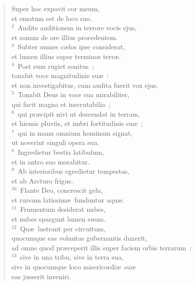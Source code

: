 \begin{flushleft}\begin{verse}\vspace{-19pt}\hspace{6pt}Super hoc expavit cor meum,\\\hspace{6pt} et emotum est de loco suo.\\
${}^{2}$~Audite auditionem in terrore vocis ejus,\\ et sonum de ore illius procedentem.\\
${}^{3}$~Subter omnes c\ae los ipse considerat,\\ et lumen illius super terminos terr\ae .\\
${}^{4}$~Post eum rugiet sonitus~;\\ tonabit voce magnitudinis su\ae~:\\ et non investigabitur, cum audita fuerit vox ejus.\\
${}^{5}$~Tonabit Deus in voce sua mirabiliter,\\ qui facit magna et inscrutabilia~;\\
${}^{6}$~qui pr\ae cipit nivi ut descendat in terram,\\ et hiemis pluviis, et imbri fortitudinis su\ae~;\\
${}^{7}$~qui in manu omnium hominum signat,\\ ut noverint singuli opera sua.\\
${}^{8}$~Ingredietur bestia latibulum,\\ et in antro suo morabitur.\\
${}^{9}$~Ab interioribus egredietur tempestas,\\ et ab Arcturo frigus.\\
${}^{10}$~Flante Deo, concrescit gelu,\\ et rursum latissim\ae\ funduntur aqu\ae .\\
${}^{11}$~Frumentum desiderat nubes,\\ et nubes spargunt lumen suum.\\
${}^{12}$~Qu\ae\ lustrant per circuitum,\\ quocumque eas voluntas gubernantis duxerit,\\ ad omne quod pr\ae ceperit illis super faciem orbis terrarum~:\\
${}^{13}$~sive in una tribu, sive in terra sua,\\ sive in quocumque loco misericordi\ae\ su\ae \\ eas jusserit inveniri.\\

\end{verse}
\end{flushleft}

